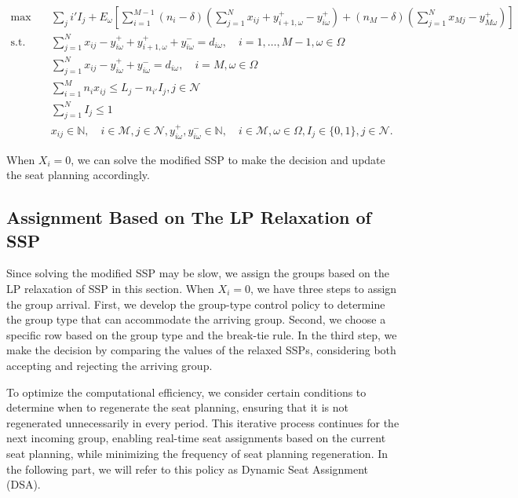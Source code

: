 \begin{equation}\label{adjusted_SSP}
  \begin{aligned}
  \max \quad & \sum_{j} i{'} I_j + E_{\omega}\left[\sum_{i=1}^{M-1} (n_i-\delta) (\sum_{j= 1}^{N} x_{ij} + y_{i+1,\omega}^{+} - y_{i \omega}^{+}) + (n_{M}-\delta) (\sum_{j= 1}^{N} x_{Mj} - y_{M \omega}^{+})\right] \\
  \text {s.t.} \quad & \sum_{j= 1}^{N} x_{ij}-y_{i \omega}^{+}+
  y_{i+1, \omega}^{+} + y_{i \omega}^{-}=d_{i \omega}, \quad i = 1,\ldots,M-1, \omega \in \Omega \\
  & \sum_{j= 1}^{N} x_{ij} -y_{i \omega}^{+}+y_{i \omega}^{-}=d_{i \omega}, \quad i = M, \omega \in \Omega \\
  & \sum_{i=1}^{M} n_{i} x_{ij} \leq L_j - n_{i{'}} I_j, j \in \mathcal{N} \\
  & \sum_{j=1}^{N} I_j \leq 1 \\
  & x_{ij} \in \mathbb{N}, \quad i \in \mathcal{M}, j \in \mathcal{N}, y_{i \omega}^{+}, y_{i \omega}^{-} \in \mathbb{N}, \quad i \in \mathcal{M}, \omega \in \Omega,  I_j \in \{0,1\}, j \in \mathcal{N}.
  \end{aligned}
\end{equation}

When $X_i = 0$, we can solve the modified SSP to make the decision and update the seat planning accordingly.


\subsection{Assignment Based on The LP Relaxation of SSP}
Since solving the modified SSP may be slow, we assign the groups based on the LP relaxation of SSP in this section. When $X_i = 0$, we have three steps to assign the group arrival. First, we develop the group-type control policy to determine the group type that can accommodate the arriving group. Second, we choose a specific row based on the group type and the break-tie rule. In the third step, we make the decision by comparing the values of the relaxed SSPs, considering both accepting and rejecting the arriving group.

To optimize the computational efficiency, we consider certain conditions to determine when to regenerate the seat planning, ensuring that it is not regenerated unnecessarily in every period. This iterative process continues for the next incoming group, enabling real-time seat assignments based on the current seat planning, while minimizing the frequency of seat planning regeneration. In the following part, we will refer to this policy as Dynamic Seat Assignment (DSA).


